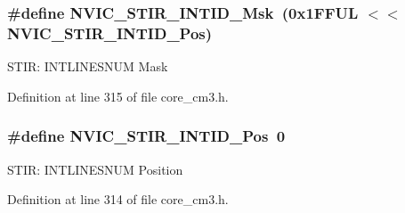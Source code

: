 \subsubsection[{\texorpdfstring{N\+V\+I\+C\+\_\+\+S\+T\+I\+R\+\_\+\+I\+N\+T\+I\+D\+\_\+\+Msk}{NVIC_STIR_INTID_Msk}}]{\setlength{\rightskip}{0pt plus 5cm}\#define N\+V\+I\+C\+\_\+\+S\+T\+I\+R\+\_\+\+I\+N\+T\+I\+D\+\_\+\+Msk~(0x1\+F\+F\+U\+L $<$$<$ N\+V\+I\+C\+\_\+\+S\+T\+I\+R\+\_\+\+I\+N\+T\+I\+D\+\_\+\+Pos)}\hypertarget{group__CMSIS__NVIC_gae4060c4dfcebb08871ca4244176ce752}{}\label{group__CMSIS__NVIC_gae4060c4dfcebb08871ca4244176ce752}
S\+T\+IR\+: I\+N\+T\+L\+I\+N\+E\+S\+N\+UM Mask 

Definition at line 315 of file core\+\_\+cm3.\+h.

\subsubsection[{\texorpdfstring{N\+V\+I\+C\+\_\+\+S\+T\+I\+R\+\_\+\+I\+N\+T\+I\+D\+\_\+\+Pos}{NVIC_STIR_INTID_Pos}}]{\setlength{\rightskip}{0pt plus 5cm}\#define N\+V\+I\+C\+\_\+\+S\+T\+I\+R\+\_\+\+I\+N\+T\+I\+D\+\_\+\+Pos~0}\hypertarget{group__CMSIS__NVIC_ga9eebe495e2e48d302211108837a2b3e8}{}\label{group__CMSIS__NVIC_ga9eebe495e2e48d302211108837a2b3e8}
S\+T\+IR\+: I\+N\+T\+L\+I\+N\+E\+S\+N\+UM Position 

Definition at line 314 of file core\+\_\+cm3.\+h.

